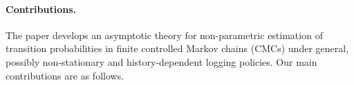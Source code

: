 \documentclass[twoside,11pt]{article}
\numberwithin{equation}{section}
\begin{document}
\paragraph{Contributions.} 
The paper develops an asymptotic theory for non-parametric estimation of transition probabilities in finite controlled Markov chains (CMCs) under general, possibly non-stationary and history-dependent logging policies. Our main contributions are as follows.
\end{document}
